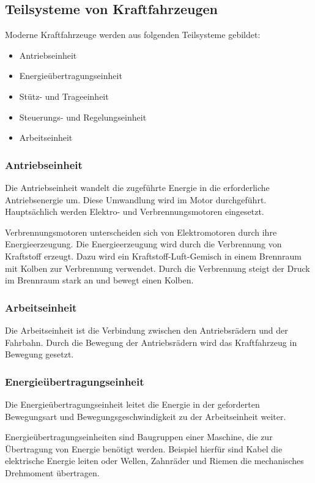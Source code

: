 \subsection{Teilsysteme von Kraftfahrzeugen}
Moderne Kraftfahrzeuge werden aus folgenden Teilsysteme gebildet:
\begin{itemize}
	\item Antriebseinheit
	\item Energieübertragungseinheit
	\item Stütz- und Trageeinheit
	\item Steuerungs- und Regelungseinheit
	\item Arbeitseinheit
\end{itemize}


\subsubsection{Antriebseinheit}
Die Antriebseinheit wandelt die zugeführte Energie in die erforderliche Antriebsenergie um.
Diese Umwandlung wird im Motor durchgeführt.
Hauptsächlich werden Elektro- und Verbrennungsmotoren eingesetzt.

Verbrennungsmotoren unterscheiden sich von Elektromotoren durch ihre Energieerzeugung.
Die Energieerzeugung wird durch die Verbrennung von Kraftstoff erzeugt.
Dazu wird ein Kraftstoff-Luft-Gemisch in einem Brennraum mit Kolben zur Verbrennung verwendet.
Durch die Verbrennung steigt der Druck im Brennraum stark an und bewegt einen Kolben.

\subsubsection{Arbeitseinheit}
Die Arbeitseinheit ist die Verbindung zwischen den Antriebsrädern und der Fahrbahn.
Durch die Bewegung der Antriebsrädern wird das Kraftfahrzeug in Bewegung gesetzt.

\subsubsection{Energieübertragungseinheit}
Die Energieübertragungseinheit leitet die Energie in der geforderten Bewegungsart und Bewegungsgeschwindigkeit zu der Arbeitseinheit weiter.

Energieübertragungseinheiten sind Baugruppen einer Maschine, die zur Übertragung von Energie benötigt werden.
Beispiel hierfür sind Kabel die elektrische Energie leiten oder Wellen, Zahnräder und Riemen die mechanisches Drehmoment übertragen.


